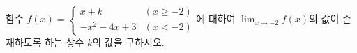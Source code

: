 함수 $f(x)=\begin{cases} x+k & (x\ge -2) \\ -x^2-4x+3 & (x<-2) \end{cases}$에 대하여 $\displaystyle\lim_{x\to -2}f(x)$의 값이 존재하도록 하는 상수 $k$의 값을 구하시오.
